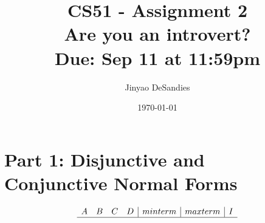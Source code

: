 \documentclass[11pt]{article}
\title{CS51 - Assignment 2\\Are you an introvert?\\{\normalsize Due: Sep 11 at 11:59pm}}
\author{Jinyao DeSandies}
\date{\today}
\begin{document}
\maketitle

\section{Part 1: Disjunctive and Conjunctive Normal Forms}


\begin{displaymath}
\begin{array}{cccc|c|c|c}
A & B & C & D  & minterm & maxterm & I\\
\hline


\end{array}
\end{displaymath}
\end{document}
